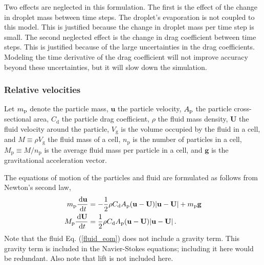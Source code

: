 Two effects are neglected in this formulation. The first is the effect of the change in droplet mass between  time steps. The droplet's evaporation is not coupled to this model. This is justified because the change in droplet mass per time step is small. The second neglected effect is the change in drag coefficient between time steps. This is justified because of the large uncertainties in the drag coefficients. Modeling the time derivative of the drag coefficient will not improve accuracy beyond these uncertainties, but it will slow down the simulation.

\subsubsection*{Relative velocities}
Let $m_{\rm p}$ denote the particle mass, $\mathbf{u}$ the particle velocity, $A_{\rm p}$ the particle cross-sectional area, $C_\text{d}$ the particle drag coefficient, $\rho$ the fluid mass density, $\mathbf{U}$ the fluid velocity around the particle, $V_\text{g}$ is the volume occupied by the fluid in a cell, and $M \equiv \rho V_\text{g}$ the fluid mass of a cell, $n_\text{p}$ is the number of particles in a cell, $M_\text{p} \equiv M/n_\text{p}$ is the average fluid mass per particle in a cell, and $\mathbf{g}$ is the gravitational acceleration vector.

The equations of motion of the particles and fluid are formulated as follows from Newton's second law,
\begin{align}
    \label{particle_eom}
    m_{\rm p} \frac{\,\mathrm{d} \mathbf{u}}{\,\mathrm{d} t} &= - \frac{1}{2} \rho C_\text{d} A_{\rm p} (\mathbf{u} - \mathbf{U}) |\mathbf{u} - \mathbf{U}| + m_{\rm p} \mathbf{g} \\
    \label{fluid_eom}
    M_{\rm p} \frac{\,\mathrm{d} \mathbf{U}}{\,\mathrm{d} t} &= \frac{1}{2} \rho C_\text{d} A_{\rm p} (\mathbf{u} - \mathbf{U}) |\mathbf{u} - \mathbf{U}| \,.
\end{align}
Note that the fluid Eq. (\ref{fluid_eom}) does not include a gravity term. This gravity term is included in the Navier-Stokes equations; including it here would be redundant. Also note that lift is not included here.

